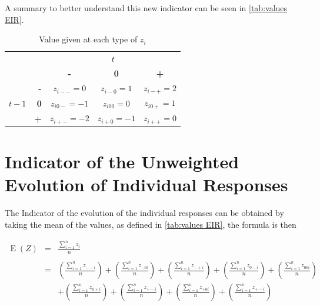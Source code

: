 \documentclass[12pt,a4paper,oneside]{book}
\DeclareMathOperator{\E}{E}
\begin{document}
A summary to better understand this new indicator can be seen in \autoref{tab:values EIR}. 

\begin{table}[H]
    \centering
    \begin{tabular}{r | r | c c c | }
    \multicolumn{1}{r}{} & \multicolumn{1}{r}{} &	\multicolumn{3}{c}{$t$} \\ \cline{3-5}
    \multicolumn{1}{r}{} & 		& \textbf{-} & \textbf{0} & \textbf{+} \\ \cline{2-5}
   		&    \textbf{-} & $z_{i--}=0$	& $z_{i-0}=1$	& $z_{i-+}=2$ \\ 
    $t-1$ & \textbf{0}  & $z_{i0-}=-1$	& $z_{i00}=0$	& $z_{i0+}=1$	\\
    		& \textbf{+}& $z_{i+-}=-2$	& $z_{i+0}=-1$	& $z_{i++}=0$ \\ \cline{2-5}
\end{tabular}
    \caption{Value given at each type of $z_i$}
    \label{tab:values EIR}
\end{table}{}

\section{Indicator of the Unweighted Evolution of Individual Responses}


The Indicator of the evolution of the individual responses can be obtained by taking the mean of the values, as defined in \autoref{tab:values EIR}, the formula is then

\begin{eqnarray}
    \E(Z) &=&  \frac{ \sum_{i=1}^n z_i}{n} \\ \nonumber \\
        &=& \left( \frac{ \sum_{i=1}^n z_{--i}}{n} \right)
     + \left( \frac{\sum_{i=1}^n z_{-0i} }{n} \right)
    + \left( \frac{\sum_{i=1}^n z_{-+i}}{n} \right)
    + \left( \frac{\sum_{i=1}^n z_{0-i} }{n} \right)
    + \left( \frac{\sum_{i=1}^n z_{00i} }{n} \right) \nonumber  \\
    &&  + \left( \frac{\sum_{i=1}^n z_{0+i}}{n} \right)
    + \left( \frac{\sum_{i=1}^n z_{+-i} }{n} \right)
    + \left( \frac{\sum_{i=1}^n z_{+0i} }{n} \right)
    + \left( \frac{\sum_{i=1}^n z_{+-i}}{n} \right)
\end{eqnarray}
\end{document}
